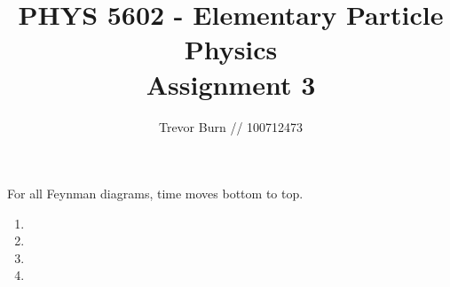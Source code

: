 \documentclass{article}
\title{PHYS 5602 - Elementary Particle Physics \\ Assignment 3}
\author{Trevor Burn // 100712473}
\begin{document}
\maketitle

For all Feynman diagrams, time moves bottom to top.

\begin{enumerate}
	\item 
	\item 
	\item 
	\item 
\end{enumerate}
\end{document}
